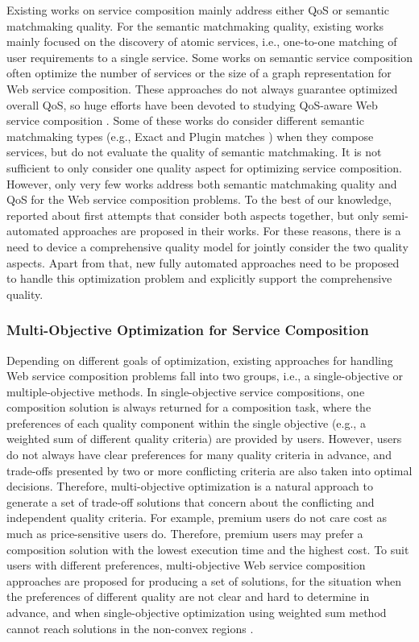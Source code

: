 Existing works on service composition mainly address either QoS or semantic matchmaking quality. For the semantic matchmaking quality, existing works mainly focused on the discovery of atomic services, i.e., one-to-one matching of user requirements to a single service. Some works \cite{bansal2016generalized,boustil2014semantic,mier2015integrated} on semantic service composition often optimize the number of services or the size of a graph representation for Web service composition. These approaches do not always guarantee  optimized overall QoS, so huge efforts have been devoted to studying QoS-aware Web service composition \cite{da2015graphevol,da2016particle,gupta2015optimization,ma2015hybrid,qi2010combining,yu2013adaptive}. Some of these works do consider different semantic matchmaking types (e.g., Exact and Plugin matches \cite{paolucci2002semantic}) when they compose services, but do not evaluate the quality of semantic matchmaking. It is not sufficient to only consider one quality aspect for optimizing service composition. However, only very few works address both semantic matchmaking quality and QoS for the Web service composition problems. To the best of our knowledge, \cite{fanjiang2014semantic,lecue2009optimizing,pop2009immune} reported about first attempts that consider both aspects together, but only semi-automated approaches are proposed in their works. For these reasons, there is a need to device a comprehensive quality model for jointly consider the two quality aspects. Apart from that, new fully automated approaches need to be proposed to handle this optimization problem and explicitly support the comprehensive quality. 


\subsubsection{Multi-Objective Optimization for Service Composition}
Depending on different goals of optimization, existing approaches for handling Web service composition problems fall into two groups, i.e., a single-objective or multiple-objective methods. In single-objective service compositions, one composition solution is always returned for a composition task, where the preferences of each quality component within the single objective (e.g., a weighted sum of different quality criteria) are provided by users. However, users do not always have clear preferences for many quality criteria in advance, and trade-offs presented by two or more conflicting criteria are also taken into optimal decisions. Therefore, multi-objective optimization is a natural approach to generate a set of trade-off solutions that concern about the conflicting and independent quality criteria. For example, premium users do not care cost as much as price-sensitive users do. Therefore, premium users may prefer a composition solution with the lowest execution time and the highest cost. To suit users with different preferences, multi-objective Web service composition approaches are proposed for producing a set of solutions, for the situation when the preferences of different quality are not clear and hard to determine in advance, and when single-objective optimization using weighted sum method cannot reach solutions in the non-convex regions \cite{kim2006adaptive}.  

